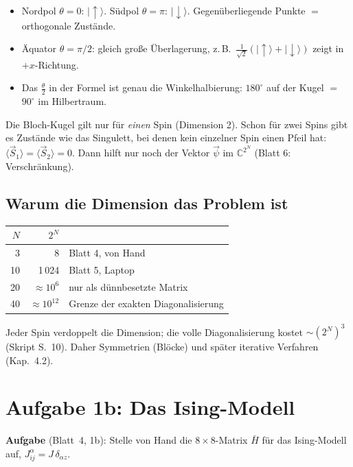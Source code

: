 \documentclass[11pt,a4paper]{article}
\newcommand{\ket}[1]{\lvert #1\rangle}
\newcommand{\up}{{\uparrow}}
\newcommand{\dn}{{\downarrow}}
\newcommand{\Hbar}{\bar H}
\begin{document}
\begin{itemize}[itemsep=2pt]
\item Nordpol $\theta=0$: $\ket\up$. Südpol $\theta=\pi$: $\ket\dn$. Gegenüberliegende Punkte $=$ orthogonale Zustände.
\item Äquator $\theta=\pi/2$: gleich große Überlagerung, z.\,B.\ $\tfrac1{\sqrt2}(\ket\up+\ket\dn)$ zeigt in $+x$-Richtung.
\item Das $\tfrac\theta2$ in der Formel ist genau die Winkelhalbierung: $180^\circ$ auf der Kugel $=$ $90^\circ$ im Hilbertraum.
\end{itemize}

\begin{merk}
Die Bloch-Kugel gilt nur für \emph{einen} Spin (Dimension 2). Schon für zwei Spins gibt es Zustände wie das Singulett, bei denen kein einzelner Spin einen Pfeil hat: $\langle\vec S_1\rangle = \langle\vec S_2\rangle = 0$. Dann hilft nur noch der Vektor $\vec\psi$ im $\mathbb C^{2^N}$ (Blatt 6: Verschränkung).
\end{merk}

\subsection{Warum die Dimension das Problem ist}

\begin{center}
\begin{tabular}{@{}rrl@{}}
\toprule
$N$ & $2^N$ & \\
\midrule
3 & 8 & Blatt 4, von Hand\\
10 & 1\,024 & Blatt 5, Laptop\\
20 & $\approx 10^6$ & nur als dünnbesetzte Matrix\\
40 & $\approx 10^{12}$ & Grenze der exakten Diagonalisierung\\
\bottomrule
\end{tabular}
\end{center}
Jeder Spin verdoppelt die Dimension; die volle Diagonalisierung kostet $\sim(2^N)^3$ (Skript S.~10). Daher Symmetrien (Blöcke) und später iterative Verfahren (Kap.~4.2).

\section{Aufgabe 1b: Das Ising-Modell}

\textbf{Aufgabe} (Blatt~4, 1b): Stelle von Hand die $8\times8$-Matrix $\Hbar$ für das Ising-Modell auf, $J^\alpha_{ij} = J\,\delta_{\alpha z}$.
\end{document}
